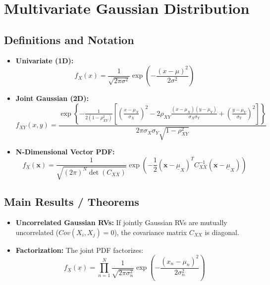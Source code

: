 \documentclass[12pt]{article}
\begin{document}
\section{Multivariate Gaussian Distribution}
\subsection{Definitions and Notation}
\begin{itemize}
    \item \textbf{Univariate (1D):} 
    \[ f_{X}(x) = \frac{1}{\sqrt{2\pi\sigma^{2}}} \exp\left(-\frac{(x-\mu)^{2}}{2\sigma^{2}}\right) \]
    \item \textbf{Joint Gaussian (2D):}
    \[ f_{XY}(x,y) = \frac{\exp\left\{-\frac{1}{2(1-\rho_{XY}^{2})} \left[ \left(\frac{x-\mu_{X}}{\sigma_{X}}\right)^{2} - 2\rho_{XY} \frac{(x-\mu_{X})(y-\mu_{Y})}{\sigma_{X}\sigma_{Y}} + \left(\frac{y-\mu_{Y}}{\sigma_{Y}}\right)^{2} \right] \right\}}{2\pi\sigma_{X}\sigma_{Y}\sqrt{1-\rho_{XY}^{2}}} \]
    \item \textbf{N-Dimensional Vector PDF:}
    \[ f_{\underline{X}}(\bm{x}) = \frac{1}{\sqrt{(2\pi)^{N}\det(C_{XX})}} \exp\left(-\frac{1}{2}(\bm{x}-\underline{\mu}_{X})^{T}C_{XX}^{-1}(\bm{x}-\underline{\mu}_{X})\right) \]
\end{itemize}

\subsection{Main Results / Theorems}
\begin{itemize}
    \item \textbf{Uncorrelated Gaussian RVs:} If jointly Gaussian RVs are mutually uncorrelated ($Cov(X_{i},X_{j})=0$), the covariance matrix $C_{XX}$ is diagonal.
    \item \textbf{Factorization:} The joint PDF factorizes: 
    \[ f_{\underline{X}}(\underline{x}) = \prod_{n=1}^{N} \frac{1}{\sqrt{2\pi\sigma_{n}^{2}}} \exp\left(-\frac{(x_{n}-\mu_{n})^{2}}{2\sigma_{n}^{2}}\right) \]
\end{itemize}
\end{document}

